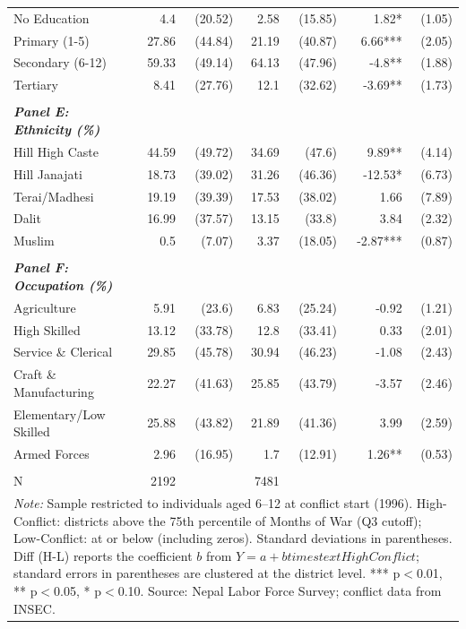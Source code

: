 \begin{landscape}
\begin{table}[!h]
{\begin{tabular}[t]{lrrrrrr}
No Education & 4.4 & (20.52) & 2.58 & (15.85) & 1.82* & (1.05)\\
Primary (1-5) & 27.86 & (44.84) & 21.19 & (40.87) & 6.66*** & (2.05)\\
\addlinespace
Secondary (6-12) & 59.33 & (49.14) & 64.13 & (47.96) & -4.8** & (1.88)\\
Tertiary & 8.41 & (27.76) & 12.1 & (32.62) & -3.69** & (1.73)\\
 &  &  &  &  &  & \\
\em{\textbf{Panel E: Ethnicity (\%)}} & \em{\textbf{}} & \em{\textbf{}} & \em{\textbf{}} & \em{\textbf{}} & \em{\textbf{}} & \em{\textbf{}}\\
Hill High Caste & 44.59 & (49.72) & 34.69 & (47.6) & 9.89** & (4.14)\\
\addlinespace
Hill Janajati & 18.73 & (39.02) & 31.26 & (46.36) & -12.53* & (6.73)\\
Terai/Madhesi & 19.19 & (39.39) & 17.53 & (38.02) & 1.66 & (7.89)\\
Dalit & 16.99 & (37.57) & 13.15 & (33.8) & 3.84 & (2.32)\\
Muslim & 0.5 & (7.07) & 3.37 & (18.05) & -2.87*** & (0.87)\\
 &  &  &  &  &  & \\
\addlinespace
\em{\textbf{Panel F: Occupation (\%)}} & \em{\textbf{}} & \em{\textbf{}} & \em{\textbf{}} & \em{\textbf{}} & \em{\textbf{}} & \em{\textbf{}}\\
Agriculture & 5.91 & (23.6) & 6.83 & (25.24) & -0.92 & (1.21)\\
High Skilled & 13.12 & (33.78) & 12.8 & (33.41) & 0.33 & (2.01)\\
Service \& Clerical & 29.85 & (45.78) & 30.94 & (46.23) & -1.08 & (2.43)\\
Craft \& Manufacturing & 22.27 & (41.63) & 25.85 & (43.79) & -3.57 & (2.46)\\
\addlinespace
Elementary/Low Skilled & 25.88 & (43.82) & 21.89 & (41.36) & 3.99 & (2.59)\\
Armed Forces & 2.96 & (16.95) & 1.7 & (12.91) & 1.26** & (0.53)\\
 &  &  &  &  &  & \\
N & 2192 &  & 7481 &  &  & \\
\bottomrule
\multicolumn{7}{l}{\rule{0pt}{1em}\textit{Note: } Sample restricted to individuals aged 6--12 at conflict start (1996). High-Conflict: districts above the 75th percentile of Months of War (Q3 cutoff); Low-Conflict: at or below (including zeros). Standard deviations in parentheses. Diff (H-L) reports the coefficient $b$ from $Y = a + b times text{HighConflict}$; standard errors in parentheses are clustered at the district level. *** p$<$0.01, ** p$<$0.05, * p$<$0.10. Source: Nepal Labor Force Survey; conflict data from INSEC.}\\
\end{tabular}}
\end{table}
\end{landscape}
